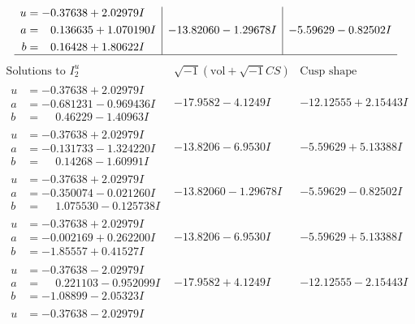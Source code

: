 \documentclass[1p]{elsarticle_modified}
\theoremstyle{definition}
\newcommand{\I}{\sqrt{-1}}
\begin{document}
$$\begin{array}{c|c|c}
\begin{aligned}
u &= -0.37638 + 2.02979 I \\
a &= \phantom{-}0.136635 + 1.070190 I \\
b &= \phantom{-}0.16428 + 1.80622 I\end{aligned}
 & -13.82060 - 1.29678 I & -5.59629 - 0.82502 I\\
 \hline 
 \end{array}$$\newpage$$\begin{array}{c|c|c}  
\text{Solutions to }I^u_{2}& \I (\text{vol} + \sqrt{-1}CS) & \text{Cusp shape}\\
 \hline 
\begin{aligned}
u &= -0.37638 + 2.02979 I \\
a &= -0.681231 - 0.969436 I \\
b &= \phantom{-}0.46229 - 1.40963 I\end{aligned}
 & -17.9582 - 4.1249 I & -12.12555 + 2.15443 I \\ \hline\begin{aligned}
u &= -0.37638 + 2.02979 I \\
a &= -0.131733 - 1.324220 I \\
b &= \phantom{-}0.14268 - 1.60991 I\end{aligned}
 & -13.8206 - 6.9530 I & -5.59629 + 5.13388 I \\ \hline\begin{aligned}
u &= -0.37638 + 2.02979 I \\
a &= -0.350074 - 0.021260 I \\
b &= \phantom{-}1.075530 - 0.125738 I\end{aligned}
 & -13.82060 - 1.29678 I & -5.59629 - 0.82502 I \\ \hline\begin{aligned}
u &= -0.37638 + 2.02979 I \\
a &= -0.002169 + 0.262200 I \\
b &= -1.85557 + 0.41527 I\end{aligned}
 & -13.8206 - 6.9530 I & -5.59629 + 5.13388 I \\ \hline\begin{aligned}
u &= -0.37638 - 2.02979 I \\
a &= \phantom{-}0.221103 - 0.952099 I \\
b &= -1.08899 - 2.05323 I\end{aligned}
 & -17.9582 + 4.1249 I & -12.12555 - 2.15443 I \\ \hline\begin{aligned}
u &= -0.37638 - 2.02979 I \\

\end{aligned}
\end{array}$$
\end{document}
